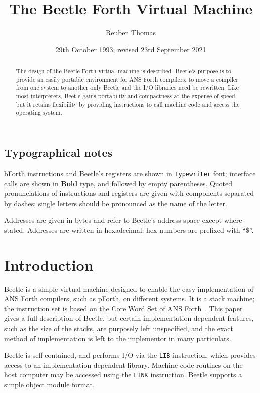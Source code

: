 \documentclass{article}
\title{The Beetle Forth Virtual Machine}
\author{Reuben Thomas}
\date{29th October 1993; revised 23rd September 2021}
\newlength{\pronunc}\pronunc=1.7in
\begin{document}
\maketitle

\begin{abstract}
\noindent The design of the Beetle Forth virtual machine is described.
Beetle's purpose is to provide an easily portable environment for ANS Forth
compilers: to move a compiler from one system to another only Beetle and the I/O
libraries need be rewritten. Like most interpreters, Beetle gains portability
and compactness at the expense of speed, but it retains flexibility by providing
instructions to call machine code and access the operating system.
\end{abstract}


\subsection*{Typographical notes}

bForth instructions and Beetle's registers are shown in {\tt Typewriter} font;
interface calls are shown in {\bf Bold} type, and followed by empty parentheses.
Quoted pronunciations of instructions and registers are given with components
separated by dashes; single letters should be pronounced as the name of the
letter.

Addresses are given in bytes and refer to Beetle's address space except where
stated. Addresses are written in hexadecimal; hex numbers are prefixed with
“\$”.


\section{Introduction}

Beetle is a simple virtual machine designed to enable the easy implementation
of ANS Forth compilers, such as \href{https://github.com/rrthomas/pforth}{pForth}, on different systems. It is a stack machine; the instruction set is based on the Core Word Set of
ANS Forth~\cite{ANSIforth}. This paper gives a full description of Beetle, but
certain implementation-dependent features, such as the size of the stacks, are
purposely left unspecified, and the exact method of implementation is left to
the implementor in many particulars.

Beetle is self-contained, and performs I/O via the {\tt LIB} instruction, which
provides access to an implementation-dependent library. Machine
code routines on the host computer may be accessed using the {\tt LINK}
instruction. Beetle supports a simple object module format.
\end{document}
